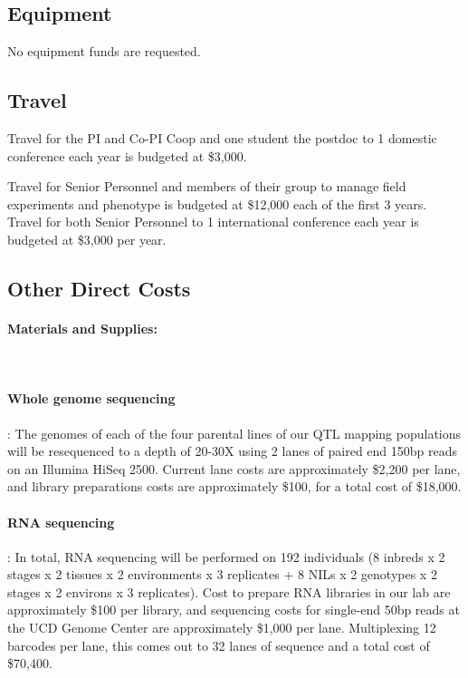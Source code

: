 \subsection*{Equipment}

No equipment funds are requested.

\subsection*{Travel}

Travel for the PI and Co-PI Coop and one student the postdoc to 1 domestic conference each year is budgeted at \$3,000.  

Travel for Senior Personnel and members of their group to manage field experiments and phenotype is budgeted at \$12,000 each of the first 3 years. Travel for both Senior Personnel to 1 international conference each year is budgeted at \$3,000 per year.

\subsection*{Other Direct Costs}

 \paragraph{Materials and Supplies:}\\
\paragraph{Whole genome sequencing}:
The genomes of each of the four parental lines of our QTL mapping populations will be resequenced to a depth of 20-30X using 2 lanes of paired end 150bp reads on an Illumina HiSeq 2500. Current lane costs are approximately \$2,200 per lane, and library preparations costs are approximately \$100, for a total cost of \$18,000.

\paragraph{RNA sequencing}:
In total, RNA sequencing will be performed on 192 individuals (8 inbreds x 2 stages x 2 tissues x 2 environments x 3 replicates + 8 NILs x 2 genotypes x 2 stages x 2 environs x 3 replicates).  Cost to prepare RNA libraries in our lab are approximately \$100 per library, and sequencing costs for single-end 50bp reads at the UCD Genome Center are approximately \$1,000 per lane.  Multiplexing 12 barcodes per lane, this comes out to 32 lanes of sequence and a total cost of \$70,400.

